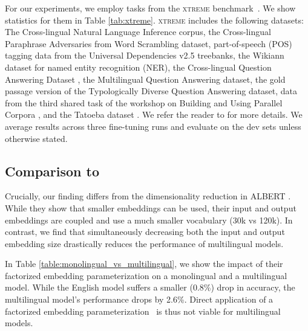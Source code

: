 \documentclass{article} \usepackage{iclr2021_conference,times}
\newcommand{\xtreme}{\textsc{xtreme}\xspace}
\begin{document}
For our experiments, we employ tasks from the \xtreme benchmark~\citep{Hu2020}. We show statistics for them in Table \ref{tab:xtreme}. \xtreme includes the following datasets: The Cross-lingual Natural Language Inference \citep[XNLI;][]{Conneau2018xnli} corpus, the Cross-lingual Paraphrase Adversaries from Word Scrambling \citep[PAWS-X;][]{Yang2019paws-x} dataset, part-of-speech (POS) tagging data from the Universal Dependencies v2.5 \citep{nivre2018universal} treebanks, the Wikiann \citep{Pan2017} dataset for named entity recognition (NER), the Cross-lingual Question Answering Dataset \citep[XQuAD;][]{artetxe2020cross}, the Multilingual Question Answering \cite[MLQA;][]{Lewis2020mlqa} dataset, the gold passage version of the Typologically Diverse Question Answering \citep[TyDiQA;][]{Clark2020tydiqa} dataset, data from the third shared task of the workshop on Building and Using Parallel Corpora \citep[BUCC;][]{zweigenbaum2018overview}, and the Tatoeba dataset \citep{Artetxe2019massively}. We refer the reader to \citep{Hu2020} for more details. We average results across three fine-tuning runs and evaluate on the dev sets unless otherwise stated. 







\subsection{Comparison to \citet{Lan2020}} \label{app:lan_comparison}

Crucially, our finding differs from the dimensionality reduction in ALBERT \citep{Lan2020}. While they show that smaller embeddings can be used, their input and output embeddings are coupled and use a much smaller vocabulary (30k vs 120k). In contrast, we find that simultaneously decreasing both the input and output embedding size drastically reduces the performance of multilingual models.

In Table \ref{table:monolingual_vs_multilingual}, we show the impact of their factorized embedding parameterization on a monolingual and a multilingual model. While the English model suffers a smaller (0.8\%) drop in accuracy, the multilingual model's performance drops by 2.6\%. Direct application of a factorized embedding parameterization~\citep{Lan2020} is thus not viable for multilingual models.
\end{document}
